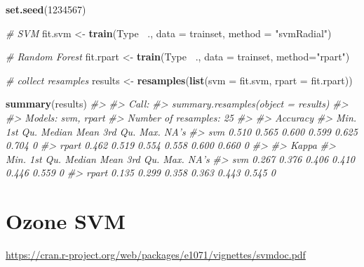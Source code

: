 \documentclass[]{book}
\newenvironment{Shaded}{\begin{snugshade}}{\end{snugshade}}
\newcommand{\CommentTok}[1]{\textcolor[rgb]{0.56,0.35,0.01}{\textit{#1}}}
\newcommand{\DataTypeTok}[1]{\textcolor[rgb]{0.13,0.29,0.53}{#1}}
\newcommand{\DecValTok}[1]{\textcolor[rgb]{0.00,0.00,0.81}{#1}}
\newcommand{\KeywordTok}[1]{\textcolor[rgb]{0.13,0.29,0.53}{\textbf{#1}}}
\newcommand{\NormalTok}[1]{#1}
\newcommand{\OperatorTok}[1]{\textcolor[rgb]{0.81,0.36,0.00}{\textbf{#1}}}
\newcommand{\StringTok}[1]{\textcolor[rgb]{0.31,0.60,0.02}{#1}}
\begin{document}
\begin{Shaded}
\begin{Highlighting}[]
\KeywordTok{set.seed}\NormalTok{(}\DecValTok{1234567}\NormalTok{)}

\CommentTok{# SVM}
\NormalTok{fit.svm <-}\StringTok{ }\KeywordTok{train}\NormalTok{(Type }\OperatorTok{~}\NormalTok{., }\DataTypeTok{data =}\NormalTok{ trainset, }
                 \DataTypeTok{method =} \StringTok{"svmRadial"}\NormalTok{)}

\CommentTok{# Random Forest}
\NormalTok{fit.rpart <-}\StringTok{ }\KeywordTok{train}\NormalTok{(Type }\OperatorTok{~}\NormalTok{., }\DataTypeTok{data =}\NormalTok{ trainset, }
                \DataTypeTok{method=}\StringTok{"rpart"}\NormalTok{)}

\CommentTok{# collect resamples}
\NormalTok{results <-}\StringTok{ }\KeywordTok{resamples}\NormalTok{(}\KeywordTok{list}\NormalTok{(}\DataTypeTok{svm =}\NormalTok{ fit.svm, }
                          \DataTypeTok{rpart  =}\NormalTok{ fit.rpart))}

\KeywordTok{summary}\NormalTok{(results)}
\CommentTok{#> }
\CommentTok{#> Call:}
\CommentTok{#> summary.resamples(object = results)}
\CommentTok{#> }
\CommentTok{#> Models: svm, rpart }
\CommentTok{#> Number of resamples: 25 }
\CommentTok{#> }
\CommentTok{#> Accuracy }
\CommentTok{#>        Min. 1st Qu. Median  Mean 3rd Qu.  Max. NA's}
\CommentTok{#> svm   0.510   0.565  0.600 0.599   0.625 0.704    0}
\CommentTok{#> rpart 0.462   0.519  0.554 0.558   0.600 0.660    0}
\CommentTok{#> }
\CommentTok{#> Kappa }
\CommentTok{#>        Min. 1st Qu. Median  Mean 3rd Qu.  Max. NA's}
\CommentTok{#> svm   0.267   0.376  0.406 0.410   0.446 0.559    0}
\CommentTok{#> rpart 0.135   0.299  0.358 0.363   0.443 0.545    0}
\end{Highlighting}
\end{Shaded}

\hypertarget{ozone-svm}{%
\chapter{Ozone SVM}\label{ozone-svm}}

\url{https://cran.r-project.org/web/packages/e1071/vignettes/svmdoc.pdf}
\end{document}

